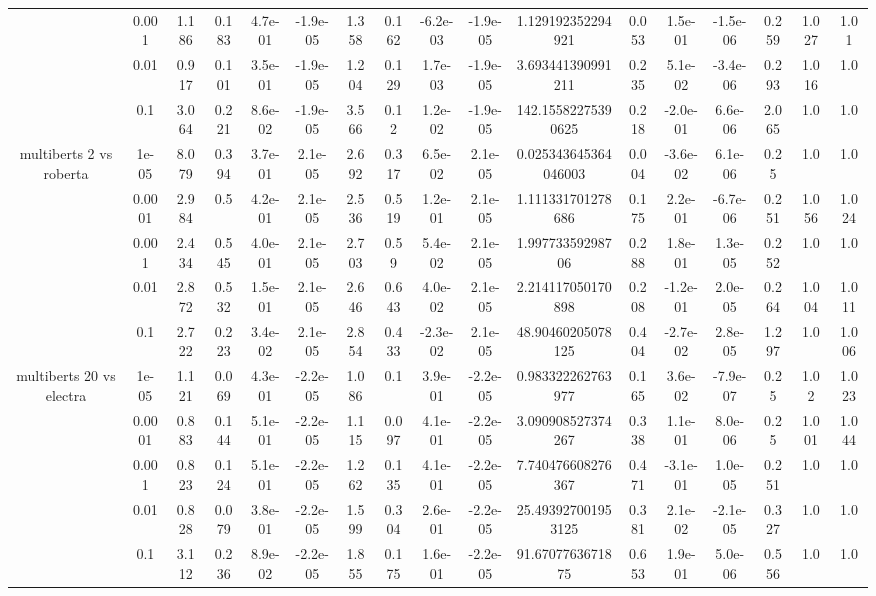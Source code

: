 \begin{tabular}{|c|c|c|c|c|c|c|c|c|c|c|c|c|c|c|c|c|}
 & 0.001 & 1.186 & 0.183 & 4.7e-01 & -1.9e-05 & 1.358 & 0.162 & -6.2e-03 & -1.9e-05 & 1.129192352294921 & 0.053 & 1.5e-01 & -1.5e-06 & 0.259 & 1.027 & 1.01 \\
 & 0.01 & 0.917 & 0.101 & 3.5e-01 & -1.9e-05 & 1.204 & 0.129 & 1.7e-03 & -1.9e-05 & 3.693441390991211 & 0.235 & 5.1e-02 & -3.4e-06 & 0.293 & 1.016 & 1.0 \\
 & 0.1 & 3.064 & 0.221 & 8.6e-02 & -1.9e-05 & 3.566 & 0.12 & 1.2e-02 & -1.9e-05 & 142.15582275390625 & 0.218 & -2.0e-01 & 6.6e-06 & 2.065 & 1.0 & 1.0 \\
\hline
\multirow{5}{*}{multiberts 2 vs roberta } & 1e-05 & 8.079 & 0.394 & 3.7e-01 & 2.1e-05 & 2.692 & 0.317 & 6.5e-02 & 2.1e-05 & 0.025343645364046003 & 0.004 & -3.6e-02 & 6.1e-06 & 0.25 & 1.0 & 1.0 \\
 & 0.0001 & 2.984 & 0.5 & 4.2e-01 & 2.1e-05 & 2.536 & 0.519 & 1.2e-01 & 2.1e-05 & 1.111331701278686 & 0.175 & 2.2e-01 & -6.7e-06 & 0.251 & 1.056 & 1.024 \\
 & 0.001 & 2.434 & 0.545 & 4.0e-01 & 2.1e-05 & 2.703 & 0.59 & 5.4e-02 & 2.1e-05 & 1.99773359298706 & 0.288 & 1.8e-01 & 1.3e-05 & 0.252 & 1.0 & 1.0 \\
 & 0.01 & 2.872 & 0.532 & 1.5e-01 & 2.1e-05 & 2.646 & 0.643 & 4.0e-02 & 2.1e-05 & 2.214117050170898 & 0.208 & -1.2e-01 & 2.0e-05 & 0.264 & 1.004 & 1.011 \\
 & 0.1 & 2.722 & 0.223 & 3.4e-02 & 2.1e-05 & 2.854 & 0.433 & -2.3e-02 & 2.1e-05 & 48.90460205078125 & 0.404 & -2.7e-02 & 2.8e-05 & 1.297 & 1.0 & 1.006 \\
\hline
\multirow{5}{*}{multiberts 20 vs electra } & 1e-05 & 1.121 & 0.069 & 4.3e-01 & -2.2e-05 & 1.086 & 0.1 & 3.9e-01 & -2.2e-05 & 0.983322262763977 & 0.165 & 3.6e-02 & -7.9e-07 & 0.25 & 1.02 & 1.023 \\
 & 0.0001 & 0.883 & 0.144 & 5.1e-01 & -2.2e-05 & 1.115 & 0.097 & 4.1e-01 & -2.2e-05 & 3.090908527374267 & 0.338 & 1.1e-01 & 8.0e-06 & 0.25 & 1.001 & 1.044 \\
 & 0.001 & 0.823 & 0.124 & 5.1e-01 & -2.2e-05 & 1.262 & 0.135 & 4.1e-01 & -2.2e-05 & 7.740476608276367 & 0.471 & -3.1e-01 & 1.0e-05 & 0.251 & 1.0 & 1.0 \\
 & 0.01 & 0.828 & 0.079 & 3.8e-01 & -2.2e-05 & 1.599 & 0.304 & 2.6e-01 & -2.2e-05 & 25.493927001953125 & 0.381 & 2.1e-02 & -2.1e-05 & 0.327 & 1.0 & 1.0 \\
 & 0.1 & 3.112 & 0.236 & 8.9e-02 & -2.2e-05 & 1.855 & 0.175 & 1.6e-01 & -2.2e-05 & 91.6707763671875 & 0.653 & 1.9e-01 & 5.0e-06 & 0.556 & 1.0 & 1.0 \\

\end{tabular}
